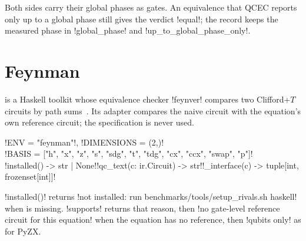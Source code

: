 Both sides carry their global phases as gates. An equivalence that QCEC reports only up to a global phase still gives the verdict \code!equal!; the record keeps the measured phase in \code!global_phase! and \code!up_to_global_phase_only!.

\section{Feynman}\label{sec:bench-tools-feynman}

 is a Haskell toolkit whose equivalence checker \code!feynver! compares two Clifford+$T$ circuits by path sums~\cite{amy2018pathsums}. Its adapter compares the naive circuit with the equation's own reference circuit; the specification is never used.

\begin{signature}
\py!ENV = "feynman"!, \py!DIMENSIONS = (2,)!\\
\py!BASIS = ["h", "x", "z", "s", "sdg", "t", "tdg", "cx", "ccx", "swap", "p"]!\\
\py!installed() -> str | None!\quad\py!qc_text(c: ir.Circuit) -> str!\quad\py!_interface(c) -> tuple[int, frozenset[int]]!
\end{signature}

\py!installed()! returns \code!not installed: run benchmarks/tools/setup_rivals.sh haskell! when  is missing. \py!supports! returns that reason, then \code!no gate-level reference circuit for this equation! when the equation has no reference, then \code!qubits only! as for PyZX.

